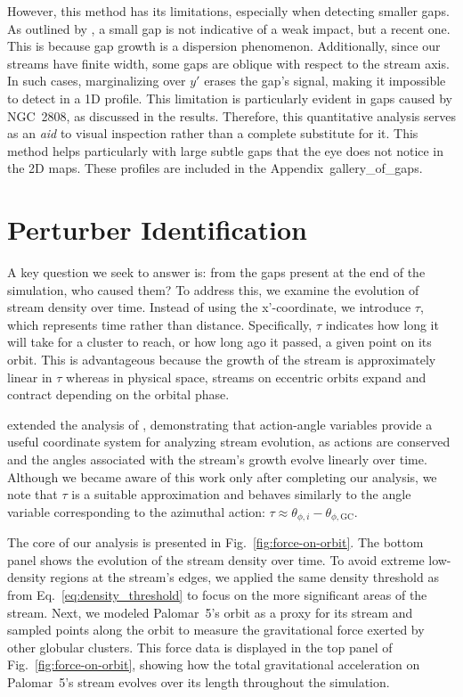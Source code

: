 \documentclass{aa}
\begin{document}
\begin{appendix}
    However, this method has its limitations, especially when detecting smaller gaps. As outlined by \citet{2015MNRAS.450.1136E}, a small gap is not indicative of a weak impact, but a recent one. This is because gap growth is a dispersion phenomenon. Additionally, since our streams have finite width, some gaps are oblique with respect to the stream axis. In such cases, marginalizing over $y'$ erases the gap's signal, making it impossible to detect in a 1D profile. This limitation is particularly evident in gaps caused by NGC~2808, as discussed in the results. Therefore, this quantitative analysis serves as an \textit{aid} to visual inspection rather than a complete substitute for it. This method helps particularly with large subtle gaps that the eye does not notice in the 2D maps. These profiles are included in the Appendix~gallery\_of\_gaps.


  \section{Perturber Identification} \label{sec:Perturber_Identification}

    A key question we seek to answer is: from the gaps present at the end of the simulation, who caused them? To address this, we examine the evolution of stream density over time. Instead of using the x'-coordinate, we introduce $\tau$, which represents time rather than distance. Specifically, $\tau$ indicates how long it will take for a cluster to reach, or how long ago it passed, a given point on its orbit. This is advantageous because the growth of the stream is approximately linear in $\tau$ whereas in physical space, streams on eccentric orbits expand and contract depending on the orbital phase.


    \citet{2016MNRAS.457.3817S} extended the analysis of \citet{2015MNRAS.450.1136E}, demonstrating that action-angle variables provide a useful coordinate system for analyzing stream evolution, as actions are conserved and the angles associated with the stream's growth evolve linearly over time. Although we became aware of this work only after completing our analysis, we note that $\tau$ is a suitable approximation and behaves similarly to the angle variable corresponding to the azimuthal action: $\tau \approx \theta_{\phi,i} - \theta_{\phi,\text{GC}}$.

    The core of our analysis is presented in Fig.~\ref{fig:force-on-orbit}. The bottom panel shows the evolution of the stream density over time. To avoid extreme low-density regions at the stream's edges, we applied the same density threshold as from Eq.~\ref{eq:density_threshold} to focus on the more significant areas of the stream. Next, we modeled Palomar~5's orbit as a proxy for its stream and sampled points along the orbit to measure the gravitational force exerted by other globular clusters. This force data is displayed in the top panel of Fig.~\ref{fig:force-on-orbit}, showing how the total gravitational acceleration on Palomar~5's stream evolves over its length throughout the simulation.


\end{appendix}
\end{document}
